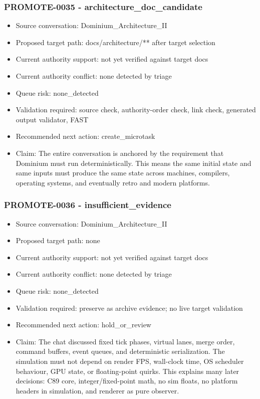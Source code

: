 \documentclass[11pt,a4paper]{report}
\begin{document}
\subsubsection{PROMOTE-0035 - architecture\_doc\_candidate}

\begin{itemize}
\item Source conversation: Dominium\_Architecture\_II
\item Proposed target path: docs/architecture/** after target selection
\item Current authority support: not yet verified against target docs
\item Current authority conflict: none detected by triage
\item Queue risk: none\_detected
\item Validation required: source check, authority-order check, link check, generated output validator, FAST
\item Recommended next action: create\_microtask
\item Claim: The entire conversation is anchored by the requirement that Dominium must run deterministically. This means the same initial state and same inputs must produce the same state across machines, compilers, operating systems, and eventually retro and modern platforms.
\end{itemize}

\subsubsection{PROMOTE-0036 - insufficient\_evidence}

\begin{itemize}
\item Source conversation: Dominium\_Architecture\_II
\item Proposed target path: none
\item Current authority support: not yet verified against target docs
\item Current authority conflict: none detected by triage
\item Queue risk: none\_detected
\item Validation required: preserve as archive evidence; no live target validation
\item Recommended next action: hold\_or\_review
\item Claim: The chat discussed fixed tick phases, virtual lanes, merge order, command buffers, event queues, and deterministic serialization. The simulation must not depend on render FPS, wall-clock time, OS scheduler behaviour, GPU state, or floating-point quirks. This explains many later decisions: C89 core, integer/fixed-point math, no sim floats, no platform headers in simulation, and renderer as pure observer.
\end{itemize}
\end{document}

